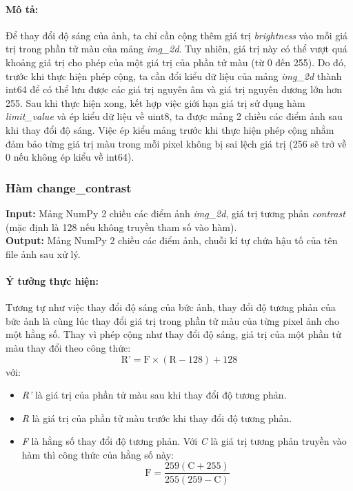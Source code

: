 \documentclass[]{article}
\begin{document}
\paragraph{Mô tả:} Để thay đổi độ sáng của ảnh, ta chỉ cần cộng thêm giá trị \textit{brightness} vào mỗi giá trị trong phần tử màu của mảng \textit{img\_2d}. Tuy nhiên, giá trị này có thể vượt quá khoảng giá trị cho phép của một giá trị của phần tử màu (từ 0 đến 255). Do đó, trước khi thực hiện phép cộng, ta cần đổi kiểu dữ liệu của mảng \textit{img\_2d} thành int64 để có thể lưu được các giá trị nguyên âm và giá trị nguyên dương lớn hơn 255. Sau khi thực hiện xong, kết hợp việc giới hạn giá trị sử dụng hàm \textit{limit\_value} và ép kiểu dữ liệu về uint8, ta được mảng 2 chiều các điểm ảnh sau khi thay đổi độ sáng. Việc ép kiểu mảng trước khi thực hiện phép cộng nhằm đảm bảo từng giá trị màu trong mỗi pixel không bị sai lệch giá trị (256 sẽ trở về 0 nếu không ép kiểu về int64).

\subsubsection{Hàm change\_contrast}
\textbf{Input:} Mảng NumPy 2 chiều các điểm ảnh \textit{img\_2d}, giá trị tương phản \textit{contrast} (mặc định là 128 nếu không truyền tham số vào hàm). \\
\textbf{Output:} Mảng NumPy 2 chiều các điểm ảnh, chuỗi kí tự chứa hậu tố của tên file ảnh sau xử lý.

\paragraph{Ý tưởng thực hiện:} Tương tự như việc thay đổi độ sáng của bức ảnh, thay đổi độ tương phản của bức ảnh là cùng lúc thay đổi giá trị trong phần tử màu của từng pixel ảnh cho một hằng số. Thay vì phép cộng như thay đổi độ sáng, giá trị của một phần tử màu thay đổi theo công thức:
\[ \text{R'} = \text{F} \times (\text{R}-128) + 128 \]
với:
\begin{itemize}
    \item \textit{R'} là giá trị của phần tử màu sau khi thay đổi độ tương phản.
    \item \textit{R} là giá trị của phần tử màu trước khi thay đổi độ tương phản.
    \item \textit{F} là hằng số thay đổi độ tương phản. Với \textit{C} là giá trị tương phản truyền vào hàm thì công thức của hằng số này:
    \[ \text{F} = \frac{259(\text{C}+255)}{255(259-\text{C})} \]
\end{itemize}
\end{document}
